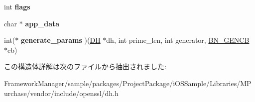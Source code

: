 \begin{DoxyCompactItemize}
\item 
\hypertarget{structdh__method_ab1ae3816d0648ee6d7345087df0fa61c}{}int {\bfseries flags}\label{structdh__method_ab1ae3816d0648ee6d7345087df0fa61c}

\item 
\hypertarget{structdh__method_a01cec981a5f6dd3386a24f083cf9812d}{}char $\ast$ {\bfseries app\+\_\+data}\label{structdh__method_a01cec981a5f6dd3386a24f083cf9812d}

\item 
\hypertarget{structdh__method_ae2c9fce365f3381757c58f0e00441453}{}int($\ast$ {\bfseries generate\+\_\+params} )(\hyperlink{structdh__st}{D\+H} $\ast$dh, int prime\+\_\+len, int generator, \hyperlink{structbn__gencb__st}{B\+N\+\_\+\+G\+E\+N\+C\+B} $\ast$cb)\label{structdh__method_ae2c9fce365f3381757c58f0e00441453}

\end{DoxyCompactItemize}


この構造体詳解は次のファイルから抽出されました\+:\begin{DoxyCompactItemize}
\item 
Framework\+Manager/sample/packages/\+Project\+Package/i\+O\+S\+Sample/\+Libraries/\+M\+Purchase/vendor/include/openssl/dh.\+h\end{DoxyCompactItemize}

